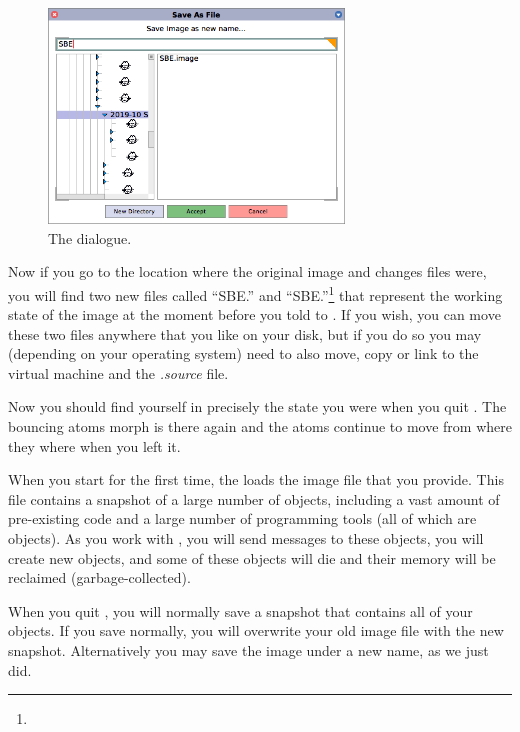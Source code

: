 \documentclass[a4paper,10pt,twoside]{book}
\begin{document}
\begin{figure}[htb]
\begin{minipage}[b]{.48\textwidth}
	{\centerline{\includegraphics[width=0.7\textwidth]{saveAs}}}
	\caption{The  dialogue.
	\label{fig:saveas}}
\end{minipage}
\end{figure}


Now if you go to the location where the original image and changes files were, you will find two new files called ``SBE.'' and ``SBE.''\footnote{} that represent the working state of the \sq image at the moment before you told \sq to .
If you wish, you can move these two files anywhere that you like on your disk, but if you do so you may (depending on your operating system) need to also move, copy or link to the virtual machine and the \emph{.source} file.


Now you should find yourself in precisely the state you were when you quit \sq. The bouncing atoms morph is there again and the atoms continue to move from where they where when you left it.

When you start \sq for the first time, the \sq {} loads the image file that you provide. This file contains a snapshot of a large number of objects, including a vast amount of pre-existing code and a large number of programming tools (all of which are objects). As you work with \sq, you will send messages to these objects, you will create new objects, and some of these objects will die and their memory will be reclaimed (\ie garbage-collected).

When you quit \sq, you will normally save a snapshot that contains all of your objects.  If you save normally, you will overwrite your old image file with the new snapshot. Alternatively you may save the image under a new name, as we just did.
\end{document}
